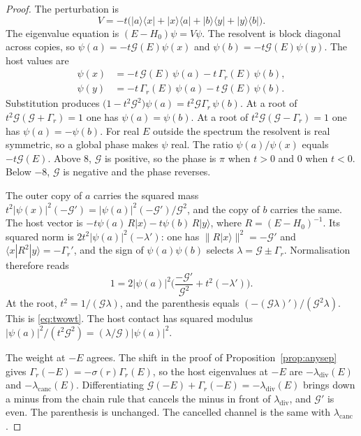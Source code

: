 \begin{proof}
The perturbation is
\[
V=-t\bigl(|a\rangle\langle x|+|x\rangle\langle a|
+|b\rangle\langle y|+|y\rangle\langle b|\bigr).
\]
The eigenvalue equation is \((E-H_0)\psi=V\psi\).
The resolvent is block diagonal across copies, so
\(\psi(a)=-t\mathcal{G}(E)\psi(x)\) and
\(\psi(b)=-t\mathcal{G}(E)\psi(y)\).
The host values are
\begin{align*}
\psi(x)
&=-t\,\mathcal{G}(E)\,\psi(a)-t\,\Gamma_r(E)\,\psi(b),\\
\psi(y)
&=-t\,\Gamma_r(E)\,\psi(a)-t\,\mathcal{G}(E)\,\psi(b).
\end{align*}
Substitution produces
\(\bigl(1-t^2\mathcal{G}^2\bigr)\psi(a)=t^2\mathcal{G}\Gamma_r\,\psi(b)\).
At a root of \(t^2\mathcal{G}(\mathcal{G}+\Gamma_r)=1\) one has
\(\psi(a)=\psi(b)\).
At a root of \(t^2\mathcal{G}(\mathcal{G}-\Gamma_r)=1\) one has
\(\psi(a)=-\psi(b)\).
For real \(E\) outside the spectrum the resolvent is real symmetric, so a
global phase makes \(\psi\) real.
The ratio \(\psi(a)/\psi(x)\) equals \(-t\mathcal{G}(E)\).
Above \(8\), \(\mathcal{G}\) is positive, so the phase is \(\pi\) when
\(t>0\) and \(0\) when \(t<0\).
Below \(-8\), \(\mathcal{G}\) is negative and the phase reverses.

The outer copy of \(a\) carries the squared mass
\(t^2|\psi(x)|^2(-\mathcal{G}')
=|\psi(a)|^2(-\mathcal{G}')/\mathcal{G}^2\),
and the copy of \(b\) carries the same.
The host vector is \(-t\psi(a)\,R|x\rangle-t\psi(b)\,R|y\rangle\), where
\(R=(E-H_0)^{-1}\).
Its squared norm is \(2t^2|\psi(a)|^2(-\lambda')\): one has
\(\|R|x\rangle\|^2=-\mathcal{G}'\) and
\(\langle x|R^2|y\rangle=-\Gamma_r'\), and the sign of
\(\psi(a)\psi(b)\) selects \(\lambda=\mathcal{G}\pm\Gamma_r\).
Normalisation therefore reads
\[
1
=2|\psi(a)|^2\Biggl(
\frac{-\mathcal{G}'}{\mathcal{G}^2}+t^2(-\lambda')
\Biggr).
\]
At the root, \(t^2=1/(\mathcal{G}\lambda)\), and the parenthesis equals
\((-(\mathcal{G}\lambda)')/(\mathcal{G}^2\lambda)\).
This is \eqref{eq:twowt}.
The host contact has squared modulus
\(|\psi(a)|^2/(t^2\mathcal{G}^2)=(\lambda/\mathcal{G})|\psi(a)|^2\).

The weight at \(-E\) agrees.
The shift in the proof of Proposition~\ref{prop:anysep} gives
\(\Gamma_r(-E)=-\sigma(r)\Gamma_r(E)\), so the host eigenvalues at \(-E\)
are \(-\lambda_{\mathrm{div}}(E)\) and \(-\lambda_{\mathrm{canc}}(E)\).
Differentiating \(\mathcal{G}(-E)+\Gamma_r(-E)=-\lambda_{\mathrm{div}}(E)\)
brings down a minus from the chain rule that cancels the minus in front
of \(\lambda_{\mathrm{div}}\), and \(\mathcal{G}'\) is even.
The parenthesis is unchanged.
The cancelled channel is the same with \(\lambda_{\mathrm{canc}}\).


\end{proof}
